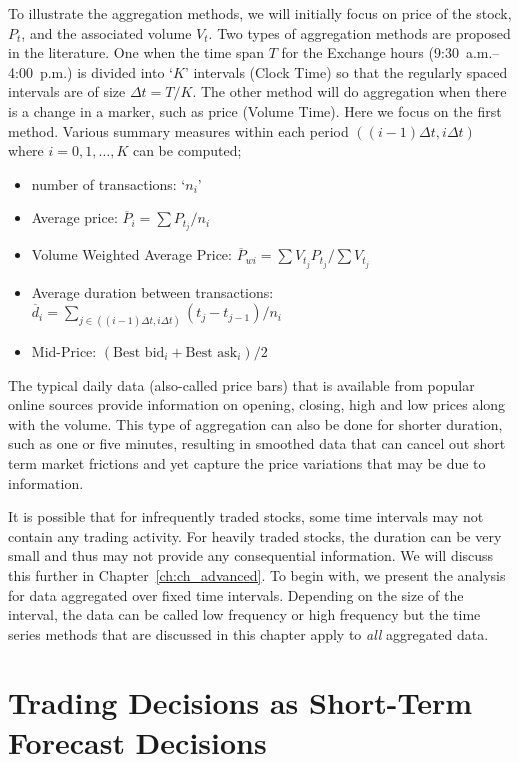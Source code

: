 To illustrate the aggregation methods, we will initially focus on price of the stock, $P_t$, and the associated volume $V_{t}$. Two types of aggregation methods are proposed in the literature. One when the time span $T$ for the Exchange hours (9:30~a.m.--4:00~p.m.) is divided into `$K$' intervals (Clock Time) so that the regularly spaced intervals are of size $\Delta t = T/K$. The other method will do aggregation when there is a change in a marker, such as price (Volume Time). Here we focus on the first method. Various summary measures within each period $((i - 1)\Delta t, i\Delta t)$ where $i = 0,1,\ldots,K$ can be computed;
        \begin{itemize}
        \item number of transactions: `$n_i$'
        \item Average price: $\overline{P}_i = \sum P_{t_j}/n_i$
        \item Volume Weighted Average Price: $\overline{P}_{wi} = \sum V_{t_j} P_{t_j}/ \sum V_{t_j}$
        \item Average duration between transactions: $\overline{d}_i = \sum_{j\in ((i-1)\Delta t,i\Delta t) }(t_j - t_{j-1})/n_i$
        \item Mid-Price: $(\text{Best bid}_i+\text{Best ask}_i)/ 2$
        \end{itemize}


The typical daily data (also-called price bars) that is available from popular online sources provide information on opening, closing, high and low prices along with the volume. This type of aggregation can also be done for shorter duration, such as one or five minutes, resulting in smoothed data that can cancel out short term market frictions and yet capture the price variations that may be due to information. 


It is possible that for infrequently traded stocks, some time intervals may not contain any trading activity. For heavily traded stocks, the duration can be very small and thus may not provide any consequential information. We will discuss this further in Chapter~\ref{ch:ch_advanced}. To begin with, we present the analysis for data aggregated over fixed time intervals. Depending on the size of the interval, the data can be called low frequency or high frequency but the time series methods that are discussed in this chapter apply to \emph{all} aggregated data.



\section{Trading Decisions as Short-Term Forecast Decisions \label{sec:trad_dec_stfd}} 

